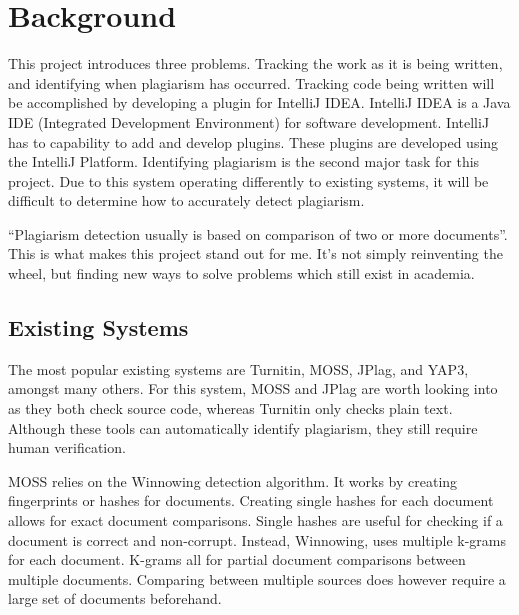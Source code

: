 \chapter{Background}
This project introduces three problems. Tracking the work as it is being written, and identifying when plagiarism has occurred. Tracking code being written will be accomplished by developing a plugin for IntelliJ IDEA. IntelliJ IDEA is a Java IDE (Integrated Development Environment) for software development. IntelliJ has to capability to add and develop plugins. These plugins are developed using the IntelliJ Platform\cite{IntelliJPlatform}. Identifying plagiarism is the second major task for this project. Due to this system operating differently to existing systems, it will be difficult to determine how to accurately detect plagiarism.

``Plagiarism detection usually is based on comparison of two or more documents''\cite{Lukashenko2007}. This is what makes this project stand out for me. It's not simply reinventing the wheel, but finding new ways to solve problems which still exist in academia. 

\section{Existing Systems}
\label{sec:existing-systems}
The most popular existing systems are Turnitin, MOSS, JPlag, and YAP3, amongst many others. For this system, MOSS and JPlag are worth looking into as they both check source code, whereas Turnitin only checks plain text\cite{Lukashenko2007}. Although these tools can automatically identify plagiarism, they still require human verification.

MOSS relies on the Winnowing detection algorithm. It works by creating fingerprints or hashes for documents\cite{Schleimer2003}. Creating single hashes for each document allows for exact document comparisons. Single hashes are useful for checking if a document is correct and non-corrupt. Instead, Winnowing, uses multiple k-grams for each document. K-grams all for partial document comparisons between multiple documents. Comparing between multiple sources does however require a large set of documents beforehand.

